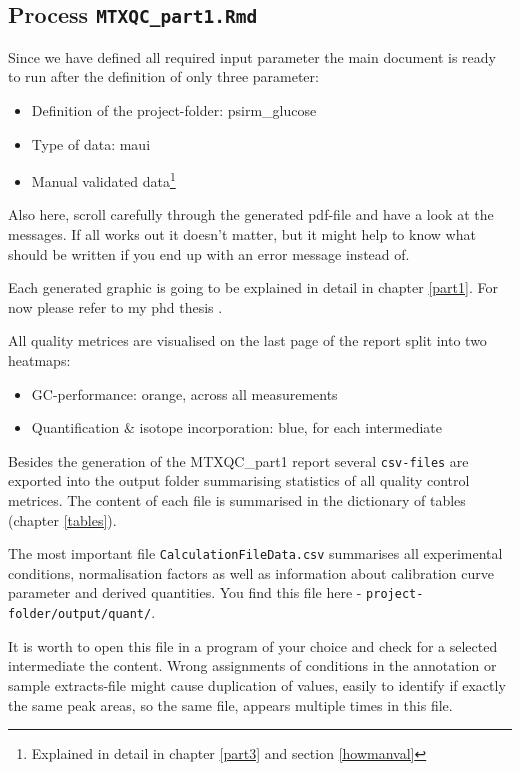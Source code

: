 \documentclass[]{book}
\providecommand{\tightlist}{%
  \setlength{\itemsep}{0pt}\setlength{\parskip}{0pt}}
\let\rmarkdownfootnote\footnote%
\def\footnote{\protect\rmarkdownfootnote}
\theoremstyle{definition}
\theoremstyle{definition}
\theoremstyle{definition}
\theoremstyle{remark}
\begin{document}
\subsection{\texorpdfstring{Process
\texttt{MTXQC\_part1.Rmd}}{Process MTXQC\_part1.Rmd}}\label{process-mtxqc_part1.rmd}

Since we have defined all required input parameter the main document is
ready to run after the definition of only three parameter:

\begin{itemize}
\tightlist
\item
  Definition of the project-folder: psirm\_glucose
\item
  Type of data: maui
\item
  Manual validated data\footnote{Explained in detail in chapter
    \ref{part3} and section \ref{howmanval}}
\end{itemize}

Also here, scroll carefully through the generated pdf-file and have a
look at the messages. If all works out it doesn't matter, but it might
help to know what should be written if you end up with an error message
instead of.

Each generated graphic is going to be explained in detail in chapter
\ref{part1}. For now please refer to my phd thesis \citep{Zasada2017}.

All quality metrices are visualised on the last page of the report split
into two heatmaps:

\begin{itemize}
\tightlist
\item
  GC-performance: orange, across all measurements
\item
  Quantification \& isotope incorporation: blue, for each intermediate
\end{itemize}

Besides the generation of the MTXQC\_part1 report several
\texttt{csv-files} are exported into the output folder summarising
statistics of all quality control metrices. The content of each file is
summarised in the dictionary of tables (chapter \ref{tables}).

The most important file \texttt{CalculationFileData.csv} summarises all
experimental conditions, normalisation factors as well as information
about calibration curve parameter and derived quantities. You find this
file here - \texttt{project-folder/output/quant/}.

It is worth to open this file in a program of your choice and check for
a selected intermediate the content. Wrong assignments of conditions in
the annotation or sample extracts-file might cause duplication of
values, easily to identify if exactly the same peak areas, so the same
file, appears multiple times in this file.
\end{document}
